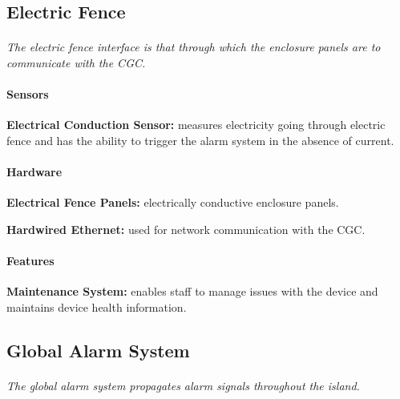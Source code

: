 \documentclass[12pt]{article}
\begin{document}
	\subsection{Electric Fence}
	\paragraph{} \textit{The electric fence interface is that through which the enclosure
	panels are to communicate with the CGC.}
	
	\paragraph{Sensors}
	\begin{list}{}{}
		\item \textbf{Electrical Conduction Sensor:} measures electricity going through 
		electric fence and has the ability to trigger the alarm system in the absence of 
		current. 
	\end{list}
		
	\paragraph{Hardware}
	\begin{list}{}{}
		\item \textbf{Electrical Fence Panels:} electrically conductive enclosure panels.
		\item \textbf{Hardwired Ethernet:} used for network communication with the CGC. 
	\end{list}
	
	\paragraph{Features}
	\begin{list}{}{}
		\item \textbf{Maintenance System:} enables staff to manage issues with the device	and 
		maintains device health information.
	\end{list}

	\subsection{Global Alarm System}
	\paragraph{} \textit{The global alarm system propagates alarm signals throughout the island.}
\end{document}
